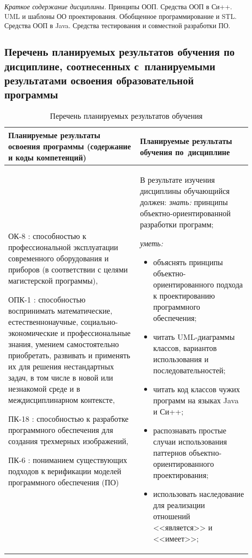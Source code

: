\documentclass[a4paper,12pt]{article}
\begin{document}
  
  \textit{Краткое содержание дисциплины.} Принципы ООП. Средства ООП в Си++. UML и шаблоны ОО проектирования. Обобщенное программирование и STL. Средства ООП в Java. Средства тестирования и совместной разработки ПО.
  
  



\subsection{Перечень планируемых результатов обучения по дисциплине, соотнесенных с~планируемыми результатами освоения образовательной программы}

\begin{longtable}{|p{54mm}|p{100mm}|}
  \caption{Перечень планируемых результатов обучения}\\
  \hline
  \centering
  Планируемые результаты освоения программы (содержание и коды компетенций) & 
  \centering\arraybackslash
  Планируемые результаты обучения по~дисциплине
  \\
  \hline
  
  ОК-8 : способностью к профессиональной эксплуатации современного оборудования и приборов (в соответствии с целями магистерской программы), \par 
  
  ОПК-1 : способностью воспринимать математические, естественнонаучные, социально-экономические и профессиональные знания, умением самостоятельно приобретать, развивать и применять их для решения нестандартных задач, в том числе в новой или незнакомой среде и в междисциплинарном контексте, \par 
  
  ПК-18 : способностью к разработке программного обеспечения для создания трехмерных изображений, \par 
  
  ПК-6 : пониманием существующих подходов к верификации моделей программного обеспечения (ПО)
  & 
  В результате изучения дисциплины обучающийся должен:\newline
  \emph{знать:}
  принципы объектно-ориентированной разработки программ;
  

  \emph{уметь:}
  \begin{itemize}[leftmargin=12pt]
    \item объяснять принципы объектно-ориентированного подхода к проектированию программного обеспечения; 
    \item читать UML-диаграммы классов, вариантов использования и последовательностей; 
    \item читать код классов чужих программ на языках Java и Си++; 
    \item распознавать простые случаи использования паттернов объектно-ориентированного проектирования; 
    \item использовать наследование для реализации отношений <<является>> и <<имеет>>; 
  \end{itemize}
  


\end{longtable}
\end{document}
